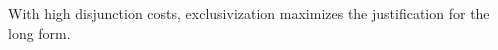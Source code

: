 \documentclass[landscape,a0paper,fontscale=0.292]{baposter}
\begin{document}
\begin{poster}
{  With high disjunction costs, exclusivization maximizes the
  justification for the long form.

  \vspace{4pt}

  
  \newcommand{\lismat}[4]{
    {\tiny
    \setlength{\arraycolsep}{1pt}
    \begin{array}[c]{l *{3}{r}}
      \toprule
      #1 & w_{1} & w_{2} & w_{1}{\vee}w_{2} \\
      \midrule
      A & #2\\
      X & #3 \\
      A\, \word{or}\, X & #4 \\
      \bottomrule
    \end{array}}}

  \newcommand{\spkmat}[4]{
    {\tiny
    \setlength{\arraycolsep}{1pt}
    \begin{array}[c]{l *{3}{r}}
      \toprule
      #1 & A & X & A\, \word{or}\, X\\
      \midrule
      w_{1} & #2\\
      w_{2} & #3 \\
      w_{1}{\vee}w_{2} & #4 \\
      \bottomrule
    \end{array}}}



}
\end{poster}
\end{document}
